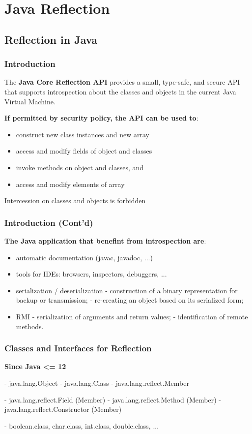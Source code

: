 \section{Java Reflection}

\subsection{Reflection in Java}

\subsubsection{Introduction}

The \textbf{Java Core Reflection API} provides a small, type-safe, and secure API that supports introspection about the classes and objects in the current Java Virtual Machine.

\textbf{If permitted by security policy, the API can be used to}:
\begin{itemize}
	\item construct new class instances and new array
	\item access and modify fields of object and classes
	\item invoke methods on object and classes, and
	\item access and modify elements of array
\end{itemize}

Intercession on classes and objects is forbidden

\subsubsection{Introduction (Cont'd)}

\textbf{The Java application that benefint from introspection are}:

\begin{itemize}
	\item automatic documentation (javac, javadoc, ...)
	\item tools for IDEs: browsers, inspectors, debuggers, ...
	\item serialization / deserialization
	- construction of a binary representation for backup or transmission;
	- re-creating an object based on its serialized form;
	\item RMI
	- serialization of arguments and return values;
	- identification of remote methods.
\end{itemize}

\subsubsection{Classes and Interfaces for Reflection}

\textbf{Since Java <= 12}

- java.lang.Object
	- java.lang.Class
	- java.lang.reflect.Member
		
		- java.lang.reflect.Field (Member)
		- java.lang.reflect.Method (Member)
		- java.lang.reflect.Constructor (Member)

- boolean.class, char.class, int.class, double.class, ...



